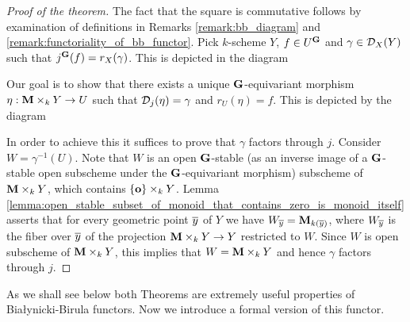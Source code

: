 \begin{proof}[Proof of the theorem]
The fact that the square is commutative follows by examination of definitions in Remarks \ref{remark:bb_diagram} and \ref{remark:functoriality_of_bb_functor}. Pick $k$-scheme $Y$, $f\in U^{\mathbf{G}}$ and $\gamma \in {\mathcal D}_X(Y)$ such that $j^{\mathbf{G}}(f) = r_X(\gamma)$. This is depicted in the diagram
\begin{center}
\end{center}
Our goal is to show that there exists a unique $\mathbf{G}$-equivariant morphism $\eta:\mathbf{M}\times_kY\rightarrow U$ such that ${\mathcal D}_j(\eta) = \gamma$ and $r_U(\eta) = f$. This is depicted by the diagram
\begin{center}
\end{center}
In order to achieve this it suffices to prove that $\gamma$ factors through $j$. Consider $W = \gamma^{-1}(U)$. Note that $W$ is an open $\mathbf{G}$-stable (as an inverse image of a $\mathbf{G}$-stable open subscheme under the $\mathbf{G}$-equivariant morphism) subscheme of $\mathbf{M}\times_kY$, which contains $\{\mathbf{o}\} \times_k Y$. Lemma \ref{lemma:open_stable_subset_of_monoid_that_contains_zero_is_monoid_itself} asserts that for every geometric point $\overline{y}$ of $Y$ we have $W_{\overline{y}} = \mathbf{M}_{k(\overline{y})}$, where $W_{\overline{y}}$ is the fiber over $\overline{y}$ of the projection $\mathbf{M}\times_kY\rightarrow Y$ restricted to $W$. Since $W$ is open subscheme of $\mathbf{M}\times_kY$, this implies that $W = \mathbf{M}\times_kY$ and hence $\gamma$ factors through $j$.
\end{proof}
\noindent
As we shall see below both Theorems are extremely useful properties of Bia{\l}ynicki-Birula functors. Now we introduce a formal version of this functor.

